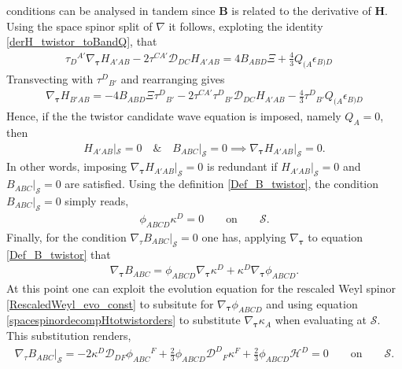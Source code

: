 \documentclass[10pt,a4paper]{article}
\theoremstyle{plain}
\def\bmB{{\bm B}}
\def\bmH{{\bm H}}
\begin{document}
conditions can be analysed in tandem since $\bmB$ is related to the
derivative of $\bmH$. Using the space spinor split of $\nabla$ it
follows, exploting the identity \eqref{derH_twistor_toBandQ}, that
\begin{align}
  \tau _{D}{}^{A'}\nabla_{\bm\tau} H_{A'AB} -2 \tau ^{CA'} \mathcal{D}
  _{DC}H_{A'AB} = 4 B_{ABD} \Xi + \tfrac{4}{3} Q_{(A}\epsilon
  _{B)D}\quad
\end{align}
Transvecting with $\tau^{D}{}_{B'}$ and rearranging gives
\begin{align}
\nabla_{\bm\tau} H_{B'AB} = -4 B_{ABD} \Xi \tau ^{D}{}_{B'} -2 \tau ^{CA'}
\tau ^{D}{}_{B'} \mathcal{D} _{DC}H_{A'AB} - \tfrac{4}{3} \tau
^{D}{}_{B'}Q_{(A}\epsilon _{B)D}
\end{align}
Hence, if the the twistor candidate wave equation is imposed, namely
$Q_A=0$, then
\begin{align}
H_{A'AB}|_{\mathcal{S}}=0\quad \& \quad B_{ABC}|_{\mathcal{S}}=0
\implies \nabla_{\bm\tau} H_{A'AB}|_{\mathcal{S}}=0.
\end{align}
In other words, imposing $\nabla_{\bm\tau} H_{A'AB}|_{\mathcal{S}}=0$ is
redundant if $H_{A'AB}|_{\mathcal{S}}=0$ and $
B_{ABC}|_{\mathcal{S}}=0$ are satisfied.  Using the definition
\eqref{Def_B_twistor}, the condition $B_{ABC}|_{\mathcal{S}}=0$ simply
reads,
\begin{align}
  \phi_{ABCD}\kappa^D=0 \qquad \text{on} \qquad \mathcal{S}.
\end{align}
Finally, for the condition $\nabla_{\tau}B_{ABC}|_{\mathcal{S}}=0$ one
has, applying $\nabla_{\bm\tau}$ to equation \eqref{Def_B_twistor} that
\begin{align}
\nabla_{\bm\tau} B_{ABC} = \phi _{ABCD}\nabla_{\bm\tau} \kappa ^{D} + \kappa
^{D} \nabla_{\bm\tau} \phi _{ABCD} .
\end{align}
At this point one can exploit the evolution equation for the rescaled
Weyl spinor \eqref{RescaledWeyl_evo_const} to subsitute for
$\nabla_{\bm\tau} \phi_{ABCD}$ and using equation
\eqref {spacespinordecompHtotwistorders}
to substitute $\nabla_{\bm\tau} \kappa_A$ when evaluating at
$\mathcal{S}$. This substitution renders,
\begin{align}\label{normalderB_twistor_exp}
\nabla_{\tau}B_{ABC}|_{\mathcal{S}}= -2\kappa ^{D} \mathcal{D}
_{DF}\phi _{ABC}{}^{F} + \tfrac{2}{3} \phi _{ABCD} \mathcal{D}
^{D}{}_{F}\kappa ^{F} + \tfrac{2}{3}\phi_{ABCD}\mathcal{H}^D = 0
\qquad \text{on} \qquad \mathcal{S}.
\end{align}
\end{document}
